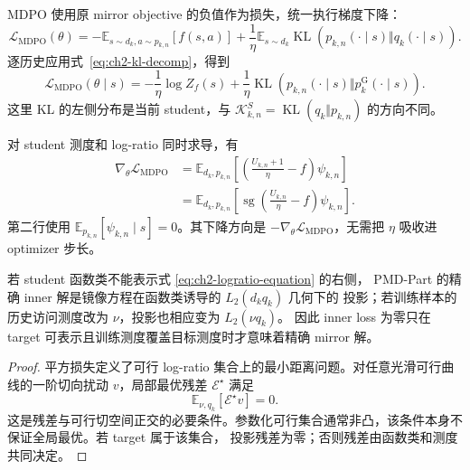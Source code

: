 MDPO 使用原 mirror objective 的负值作为损失，统一执行梯度下降：
\begin{equation}
\mathcal L_{\mathrm{MDPO}}(\theta)
=-\mathbb E_{s\sim d_k,a\sim p_{k,n}}[f(s,a)]
+\frac1\eta\mathbb E_{s\sim d_k}\operatorname{KL}( p_{k,n}(\cdot\mid s)\Vert q_k(\cdot\mid s)).
\label{eq:ch2-mdpo-objective-bridge}
\end{equation}
逐历史应用式~\eqref{eq:ch2-kl-decomp}，得到
\begin{equation}
\mathcal L_{\mathrm{MDPO}}(\theta\mid s)
=-\frac1\eta\log Z_f(s)
+\frac1\eta\operatorname{KL}( p_{k,n}(\cdot\mid s)\Vert p_k^{\mathrm G}(\cdot\mid s)).
\label{eq:ch2-mdpo-kl-gap}
\end{equation}
这里 KL 的左侧分布是当前 student，与 $\mathcal K_{k,n}^{S}=\operatorname{KL}( q_k\Vert p_{k,n})$ 的方向不同。

对 student 测度和 log-ratio 同时求导，有
\begin{align}
\nabla_\theta\mathcal L_{\mathrm{MDPO}}
&=\mathbb E_{d_k, p_{k,n}}\left[\left(\frac{U_{k,n}+1}\eta-f\right)\psi_{k,n}\right]\\
&=\mathbb E_{d_k, p_{k,n}}\left[\operatorname{sg}\!\left(\frac{U_{k,n}}\eta-f\right)\psi_{k,n}\right].
\label{eq:ch2-mdpo-gradient-bridge}
\end{align}
第二行使用 $\mathbb E_{ p_{k,n}}[\psi_{k,n}\mid s]=0$。其下降方向是 $-\nabla_\theta\mathcal L_{\mathrm{MDPO}}$，无需把 $\eta$ 吸收进 optimizer 步长。

\begin{proposition}[平方回归的投影含义]
\label{prop:ch2-regression-projection}
若 student 函数类不能表示式 \eqref{eq:ch2-logratio-equation} 的右侧，
PMD-Part 的精确 inner 解是镜像方程在函数类诱导的 $L_2(d_k q_k)$ 几何下的
投影；若训练样本的历史访问测度改为 $\nu$，投影也相应变为 $L_2(\nu q_k)$。
因此 inner loss 为零只在 target 可表示且训练测度覆盖目标测度时才意味着精确
mirror 解。
\end{proposition}

\begin{proof}
平方损失定义了可行 log-ratio 集合上的最小距离问题。对任意光滑可行曲线的一阶切向扰动 $v$，局部最优残差
$\mathscr E^\star$ 满足
\begin{equation*}
\mathbb E_{\nu, q_k}[\mathscr E^\star v]=0.
\end{equation*}
这是残差与可行切空间正交的必要条件。参数化可行集合通常非凸，该条件本身不保证全局最优。若 target 属于该集合，
投影残差为零；否则残差由函数类和测度共同决定。
\end{proof}
